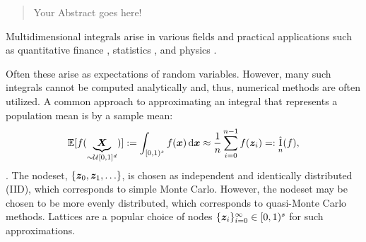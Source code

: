 \documentclass{iitthesis-au} %
\newcommand{\appxintn}{\appxint_n}
\DeclareMathOperator{\appxint}{\hat{I}}
\newcommand{\FredNote}[1]{{\color{blue}#1}}
\begin{document}
\listoftables

\clearpage

\listoffigures

\clearpage


 \clearpage



\begin{abstract}           %
\par Your Abstract goes here! 

\end{abstract}




\textpages     %



{}



Multidimensional integrals arise in various fields and practical applications such as quantitative finance \cite{CafMorOwe97}, statistics \cite{Gen92,GenBre99}, and physics \cite{PapTra97}. 


\FredNote{Often these arise as expectations of random variables.}  However, many such integrals cannot be computed analytically and, thus, numerical methods are often utilized. \FredNote{A common approach to approximating an integral that represents a population mean is by a sample mean:} 
\[
\mathbb{E}[f(\underbrace{\vX}_{\sim \mathcal{U}[0,1]^d})] : = \int_{[0,1)^s} f(\vx) \, \dif \vx \approx \frac{1}{n} \sum_{i=0}^{n-1} f(\vz_i) =:\appxintn(f),
\]
\cite{DicEtal22a,Nie92,SloJoe94}.
The nodeset, $\{\boldsymbol{z}_0, \boldsymbol{z}_1, \ldots \}$, is chosen as independent and identically distributed (IID), which corresponds to simple Monte Carlo. However, the nodeset may be chosen to be more evenly distributed, which corresponds to quasi-Monte Carlo methods. Lattices are a popular choice of nodes $\{\boldsymbol{z}_i\}_{i=0}^{\infty} \in [0,1)^s$ for such approximations. \\
\end{document}
